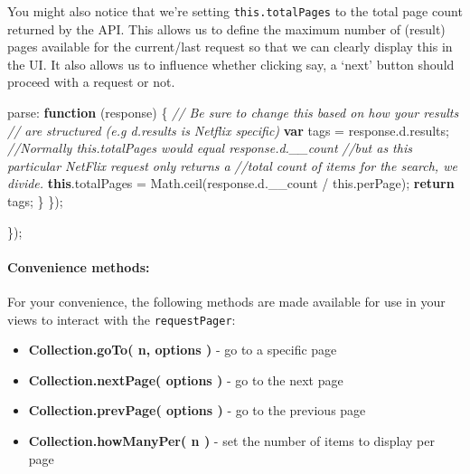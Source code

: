 \documentclass[9pt]{book}
\newenvironment{Shaded}{}{}
\newcommand{\KeywordTok}[1]{\textcolor[rgb]{0.00,0.44,0.13}{\textbf{{#1}}}}
\newcommand{\CommentTok}[1]{\textcolor[rgb]{0.38,0.63,0.69}{\textit{{#1}}}}
\newcommand{\OtherTok}[1]{\textcolor[rgb]{0.00,0.44,0.13}{{#1}}}
\newcommand{\FunctionTok}[1]{\textcolor[rgb]{0.02,0.16,0.49}{{#1}}}
\newcommand{\NormalTok}[1]{{#1}}
\begin{document}
You might also notice that we're setting \texttt{this.totalPages} to the
total page count returned by the API. This allows us to define the
maximum number of (result) pages available for the current/last request
so that we can clearly display this in the UI. It also allows us to
influence whether clicking say, a `next' button should proceed with a
request or not.

\begin{Shaded}
\begin{Highlighting}[]
        \NormalTok{parse: }\KeywordTok{function} \NormalTok{(response) \{}
            \CommentTok{// Be sure to change this based on how your results}
            \CommentTok{// are structured (e.g d.results is Netflix specific)}
            \KeywordTok{var} \NormalTok{tags = }\OtherTok{response}\NormalTok{.}\OtherTok{d}\NormalTok{.}\FunctionTok{results}\NormalTok{;}
            \CommentTok{//Normally this.totalPages would equal response.d.__count}
            \CommentTok{//but as this particular NetFlix request only returns a}
            \CommentTok{//total count of items for the search, we divide.}
            \KeywordTok{this}\NormalTok{.}\FunctionTok{totalPages} \NormalTok{= }\OtherTok{Math}\NormalTok{.}\FunctionTok{ceil}\NormalTok{(}\OtherTok{response}\NormalTok{.}\OtherTok{d}\NormalTok{.}\FunctionTok{__count} \NormalTok{/ }\OtherTok{this}\NormalTok{.}\FunctionTok{perPage}\NormalTok{);}
            \KeywordTok{return} \NormalTok{tags;}
        \NormalTok{\}}
    \NormalTok{\});}

\NormalTok{\});}
\end{Highlighting}
\end{Shaded}

\paragraph{Convenience methods:}\label{convenience-methods}

For your convenience, the following methods are made available for use
in your views to interact with the \texttt{requestPager}:

\begin{itemize}
\itemsep1pt\parskip0pt
\item
  \textbf{Collection.goTo( n, options )} - go to a specific page
\item
  \textbf{Collection.nextPage( options )} - go to the next page
\item
  \textbf{Collection.prevPage( options )} - go to the previous page
\item
  \textbf{Collection.howManyPer( n )} - set the number of items to
  display per page
\end{itemize}
\end{document}
